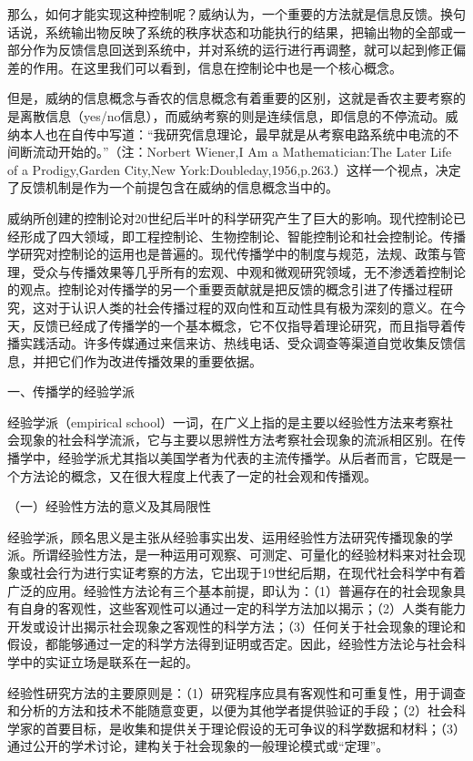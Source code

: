 \documentclass[UTF8,12pt]{ctexart}
\numberwithin{equation}{section} %
\numberwithin{figure}{section}
\numberwithin{table}{section}
\begin{document}
	那么，如何才能实现这种控制呢？威纳认为，一个重要的方法就是信息反馈。换句话说，系统输出物反映了系统的秩序状态和功能执行的结果，把输出物的全部或一部分作为反馈信息回送到系统中，并对系统的运行进行再调整，就可以起到修正偏差的作用。在这里我们可以看到，信息在控制论中也是一个核心概念。
	
	但是，威纳的信息概念与香农的信息概念有着重要的区别，这就是香农主要考察的是离散信息（yes/no信息），而威纳考察的则是连续信息，即信息的不停流动。威纳本人也在自传中写道：“我研究信息理论，最早就是从考察电路系统中电流的不间断流动开始的。”（注：Norbert Wiener,I Am a Mathematician:The Later Life of a Prodigy,Garden City,New York:Doubleday,1956,p.263.）这样一个视点，决定了反馈机制是作为一个前提包含在威纳的信息概念当中的。
	
	威纳所创建的控制论对20世纪后半叶的科学研究产生了巨大的影响。现代控制论已经形成了四大领域，即工程控制论、生物控制论、智能控制论和社会控制论。传播学研究对控制论的运用也是普遍的。现代传播学中的制度与规范，法规、政策与管理，受众与传播效果等几乎所有的宏观、中观和微观研究领域，无不渗透着控制论的观点。控制论对传播学的另一个重要贡献就是把反馈的概念引进了传播过程研究，这对于认识人类的社会传播过程的双向性和互动性具有极为深刻的意义。在今天，反馈已经成了传播学的一个基本概念，它不仅指导着理论研究，而且指导着传播实践活动。许多传媒通过来信来访、热线电话、受众调查等渠道自觉收集反馈信息，并把它们作为改进传播效果的重要依据。
	
	
	一、传播学的经验学派
	
	经验学派（empirical school）一词，在广义上指的是主要以经验性方法来考察社会现象的社会科学流派，它与主要以思辨性方法考察社会现象的流派相区别。在传播学中，经验学派尤其指以美国学者为代表的主流传播学。从后者而言，它既是一个方法论的概念，又在很大程度上代表了一定的社会观和传播观。
	
	（一）经验性方法的意义及其局限性
	
	经验学派，顾名思义是主张从经验事实出发、运用经验性方法研究传播现象的学派。所谓经验性方法，是一种运用可观察、可测定、可量化的经验材料来对社会现象或社会行为进行实证考察的方法，它出现于19世纪后期，在现代社会科学中有着广泛的应用。经验性方法论有三个基本前提，即认为：（1）普遍存在的社会现象具有自身的客观性，这些客观性可以通过一定的科学方法加以揭示；（2）人类有能力开发或设计出揭示社会现象之客观性的科学方法；（3）任何关于社会现象的理论和假设，都能够通过一定的科学方法得到证明或否定。因此，经验性方法论与社会科学中的实证立场是联系在一起的。
	
	经验性研究方法的主要原则是：（1）研究程序应具有客观性和可重复性，用于调查和分析的方法和技术不能随意变更，以便为其他学者提供验证的手段；（2）社会科学家的首要目标，是收集和提供关于理论假设的无可争议的科学数据和材料；（3）通过公开的学术讨论，建构关于社会现象的一般理论模式或“定理”。
	
\end{document}
